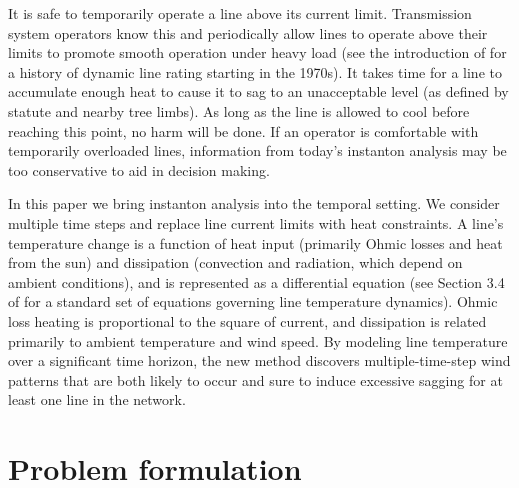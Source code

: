 \documentclass[conference]{IEEEtran}
\begin{document}
It is safe to temporarily operate a line above its current limit. Transmission system operators know this and periodically allow lines to operate above their limits to promote smooth operation under heavy load (see the introduction of \cite{banakar2005} for a history of dynamic line rating starting in the 1970s). It takes time for a line to accumulate enough heat to cause it to sag to an unacceptable level (as defined by statute and nearby tree limbs). As long as the line is allowed to cool before reaching this point, no harm will be done. If an operator is comfortable with temporarily overloaded lines, information from today's instanton analysis may be too conservative to aid in decision making.

In this paper we bring instanton analysis into the temporal setting. We consider multiple time steps and replace line current limits with heat constraints. A line's temperature change is a function of heat input (primarily Ohmic losses and heat from the sun) and dissipation (convection and radiation, which depend on ambient conditions), and is represented as a differential equation (see Section 3.4 of \cite{ieee2007} for a standard set of equations governing line temperature dynamics). Ohmic loss heating is proportional to the square of current, and dissipation is related primarily to ambient temperature and wind speed. By modeling line temperature over a significant time horizon, the new method discovers multiple-time-step wind patterns that are both likely to occur and sure to induce excessive sagging for at least one line in the network.




\section{Problem formulation}
\end{document}

